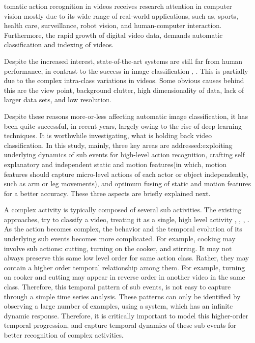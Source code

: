 
tomatic action recognition in videos receives research attention
in computer vision mostly due to its wide range of real-world applications, such as,
sports, health care, surveillance, robot vision, and human-computer interaction.
Furthermore, the rapid growth of digital video data, demands automatic
classification and indexing of videos.





Despite the increased interest, state-of-the-art
systems are still far from human performance, in contrast to the success in image classification \cite{girshick2014rich},
 \cite{krizhevsky2012imagenet}. This is partially due to the complex intra-class variations in videos. Some
obvious causes behind this are the view point, background
clutter, high dimensionality of data, lack of larger data sets, and low resolution.

Despite these reasons more-or-less affecting automatic image classification, it has been quite successful, in recent years,
largely owing to the rise of deep learning techniques. It is worthwhile investigating,
what is holding back video classification. In this study, mainly, three key
areas are addressed:exploiting underlying dynamics of sub events for high-level action recognition, crafting
self explanatory and independent static and motion features(in which, motion features should capture micro-level actions
of each actor or object independently, such as arm or leg movements), and optimum fusing of static and motion features for a better accuracy.
These three aspects are briefly explained next.

A complex activity is typically composed of several sub activities.
The existing approaches, try to classify a video, treating it as a
single, high level activity \cite{wang2011action}, \cite{wang2013action}, \cite{simonyan2014two},
\cite{7486474}.
As the action becomes complex, the behavior and the
temporal evolution of its underlying sub events becomes more complicated. For example,
cooking may involve sub actions: cutting, turning on the cooker, and stirring. It may not always preserve this
same low level order for same action class. Rather, they may contain
a higher order temporal relationship among them. For example, turning on cooker and cutting
may appear in reverse order in another video in the same class.
Therefore, this temporal pattern of sub events, is not easy to capture through a simple
time series analysis. These patterns can only be identified by observing a large number
of examples, using a system, which has an infinite dynamic response. Therefore, it is critically important to
model this higher-order temporal
progression, and capture temporal dynamics of these sub events for better recognition of
complex activities.


